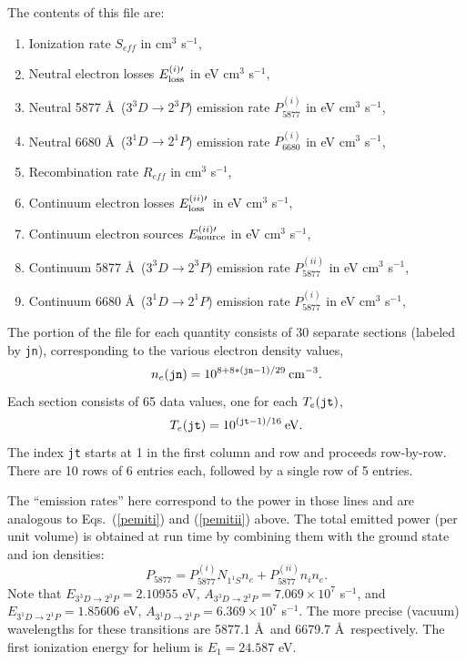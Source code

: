 \documentclass[12pt]{report}
\begin{document}
The contents of this file are:
\begin{enumerate}
  \item Ionization rate $S_{eff}$ in cm$^{3}$ s$^{-1}$,
  \item Neutral electron losses $E_{\rm loss}^{(i)\prime}$ 
in eV cm$^{3}$ s$^{-1}$,
  \item Neutral 5877 \AA\ ($3^{3}D \rightarrow 2^{3}P$) emission
rate $P_{5877}^{(i)}$ in eV cm$^{3}$ s$^{-1}$,
  \item Neutral 6680 \AA\ ($3^{1}D \rightarrow 2^{1}P$) emission
rate $P_{6680}^{(i)}$ in eV cm$^{3}$ s$^{-1}$,
  \item Recombination rate $R_{eff}$ in cm$^{3}$ s$^{-1}$,
  \item Continuum electron losses $E_{\rm loss}^{(ii)\prime}$ 
in eV cm$^{3}$ s$^{-1}$,
  \item Continuum electron sources $E_{\rm source}^{(ii)\prime}$ 
in eV cm$^{3}$ s$^{-1}$,
  \item Continuum 5877 \AA\ ($3^{3}D \rightarrow 2^{3}P$) emission
rate $P_{5877}^{(ii)}$ in eV cm$^{3}$ s$^{-1}$,
  \item Continuum 6680 \AA\ ($3^{1}D \rightarrow 2^{1}P$) emission
rate $P_{5877}^{(i)}$ in eV cm$^{3}$ s$^{-1}$,
\end{enumerate}

The portion of the file for each quantity consists of 30 separate sections 
(labeled by {\tt jn}), corresponding to the various electron density values,
\begin{equation}
n_{e}({\tt jn}) =  10^{8 + 8*({\tt jn} - 1)/29} \: {\rm cm}^{-3}.
\end{equation}
Each section consists of 65 data values, one for each $T_{e} ({\tt jt})$,
\begin{equation}
T_{e}({\tt jt}) =  10^{({\tt jt} - 1)/16} \: {\rm eV}.
\end{equation}
The index {\tt jt} starts at 1 in the first column and row and proceeds 
row-by-row. There are 10 rows of 6 entries each, followed by a single
row of 5 entries.

The ``emission rates'' here correspond to the power in those lines 
and are analogous to Eqs.~(\ref{pemiti}) and (\ref{pemitii}) above.
The total emitted power (per unit volume) is obtained at run
time by combining them with the ground state and ion densities:
\begin{equation}
P_{5877} = P_{5877}^{(i)} N_{1^{1}S} n_{e} + 
P_{5877}^{(ii)} n_{i} n_{e}.
\end{equation}
Note that $E_{3^{3}D \rightarrow 2^{3}P} = 2.10955$ eV,
$A_{3^{3}D \rightarrow 2^{3}P} = 7.069 \times 10^{7}$ s$^{-1}$, and
$E_{3^{1}D \rightarrow 2^{1}P} = 1.85606$ eV,
$A_{3^{1}D \rightarrow 2^{1}P} = 6.369 \times 10^{7}$ s$^{-1}$.
The more precise (vacuum) wavelengths for these transitions
are 5877.1 \AA\ and 6679.7 \AA\ respectively. The first
ionization energy for helium is $E_{1}= 24.587$ eV.
\end{document}
